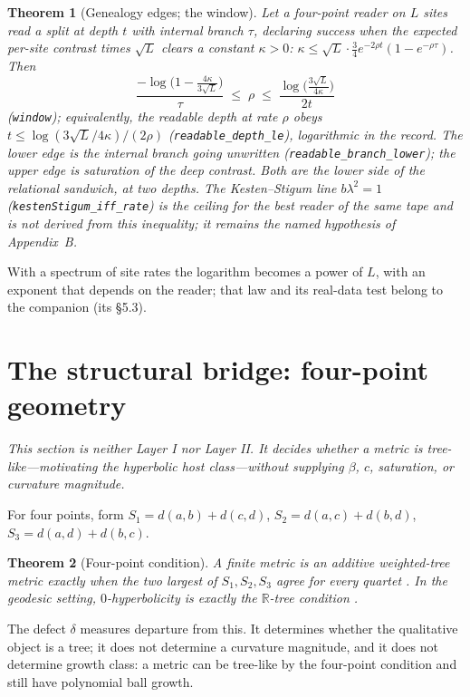 \documentclass[11pt,reqno]{amsart}
\theoremstyle{plain}
\newtheorem{theorem}{Theorem}[section]
\theoremstyle{definition}
\begin{document}
\begin{theorem}[Genealogy edges; the window]\label{thm:window}
Let a four-point reader on $L$ sites read a split at depth $t$ with internal branch $\tau$, declaring success when the expected per-site contrast times $\sqrt L$ clears a constant $\kappa>0$: $\kappa\le\sqrt L\cdot\tfrac34e^{-2\rho t}(1-e^{-\rho\tau})$. Then
\[
\frac{-\log\bigl(1-\tfrac{4\kappa}{3\sqrt L}\bigr)}{\tau}\;\le\;\rho\;\le\;\frac{\log\bigl(\tfrac{3\sqrt L}{4\kappa}\bigr)}{2t}
\]
(\texttt{window}); equivalently, the readable depth at rate $\rho$ obeys $t\le\log(3\sqrt L/4\kappa)/(2\rho)$ (\texttt{readable\_depth\_le}), logarithmic in the record. The lower edge is the internal branch going unwritten (\texttt{readable\_branch\_lower}); the upper edge is saturation of the deep contrast. Both are the lower side of the relational sandwich, at two depths. The Kesten--Stigum line $b\lambda^2=1$ (\texttt{kestenStigum\_iff\_rate}) is the ceiling for the \emph{best} reader of the same tape and is not derived from this inequality; it remains the named hypothesis of Appendix~B.
\end{theorem}

With a spectrum of site rates the logarithm becomes a power of $L$, with an exponent that depends on the reader; that law and its real-data test belong to the companion (its \S5.3).

\section{The structural bridge: four-point geometry}\label{sec:classifier}

\emph{This section is neither Layer I nor Layer II. It decides whether a metric is tree-like---motivating the hyperbolic host class---without supplying $\beta$, $c$, saturation, or curvature magnitude.}

For four points, form $S_1=d(a,b)+d(c,d)$, $S_2=d(a,c)+d(b,d)$, $S_3=d(a,d)+d(b,c)$.

\begin{theorem}[Four-point condition]\label{thm:fourpoint}
A finite metric is an additive weighted-tree metric exactly when the two largest of $S_1,S_2,S_3$ agree for every quartet \cite{buneman1971}. In the geodesic setting, $0$-hyperbolicity is exactly the $\mathbb R$-tree condition \cite{gromov1987}.
\end{theorem}

The defect $\delta$ measures departure from this. It determines whether the qualitative object is a tree; it does not determine a curvature magnitude, and it does not determine growth class: a metric can be tree-like by the four-point condition and still have polynomial ball growth.
\end{document}
